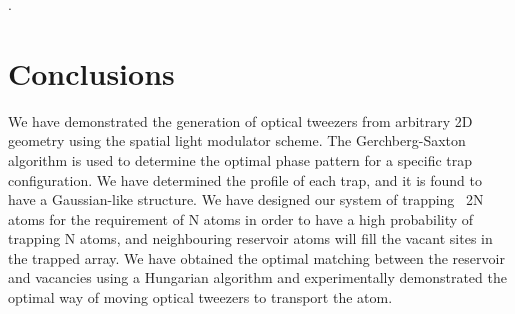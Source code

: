 \documentclass[11pt,a4paper]{article}
\begin{document}

\newpage
\thispagestyle{empty}
.
\newpage
\clearpage
\setcounter{page}{1}




\section{Conclusions}
\label{sec:Conclusion}


We have demonstrated the generation of optical tweezers from arbitrary 2D geometry using the spatial light modulator scheme. The Gerchberg-Saxton algorithm is used to determine the optimal phase pattern for a specific trap configuration. We have determined the profile of each trap, and it is found to have a Gaussian-like structure. We have designed our system of trapping ~2N atoms for the requirement of N atoms in order to have a high probability of trapping N atoms, and neighbouring reservoir atoms will fill the vacant sites in the trapped array. We have obtained the optimal matching between the reservoir and vacancies using a Hungarian algorithm and experimentally demonstrated the optimal way of moving optical tweezers to transport the atom.

\end{document}
